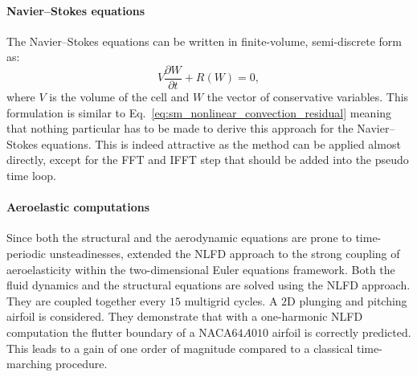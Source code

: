\paragraph{Navier--Stokes equations}
The Navier--Stokes equations can be written in finite-volume,
semi-discrete form as:
\begin{equation}
	V \frac{\partial W}{\partial t} + R(W) = 0,
	\label{eq:navier_stokes_fv_sd}
\end{equation}
where $V$ is the volume of the cell and $W$
the vector of conservative variables.
This formulation is similar to
Eq.~\eqref{eq:sm_nonlinear_convection_residual} meaning that
nothing particular has to be made to derive this approach for
the Navier--Stokes equations. This is indeed attractive as the
method can be applied almost directly, except for the FFT and IFFT
step that should be added into the pseudo time loop.

\paragraph{Aeroelastic computations}
Since both the structural and the aerodynamic equations
are prone to time-periodic unsteadinesses,
\citet{Kachra2008} extended the NLFD approach to the strong coupling of
aeroelasticity within the two-dimensional Euler equations framework.
Both the fluid dynamics and the structural equations
are solved using the NLFD approach. They are coupled together 
every $15$ multigrid cycles.
A $2$D plunging and pitching airfoil is considered.
They demonstrate that with a one-harmonic NLFD computation the
flutter boundary of a NACA$64A010$ airfoil is correctly predicted.
This leads to a gain of one order of magnitude compared to a classical
time-marching procedure. 

